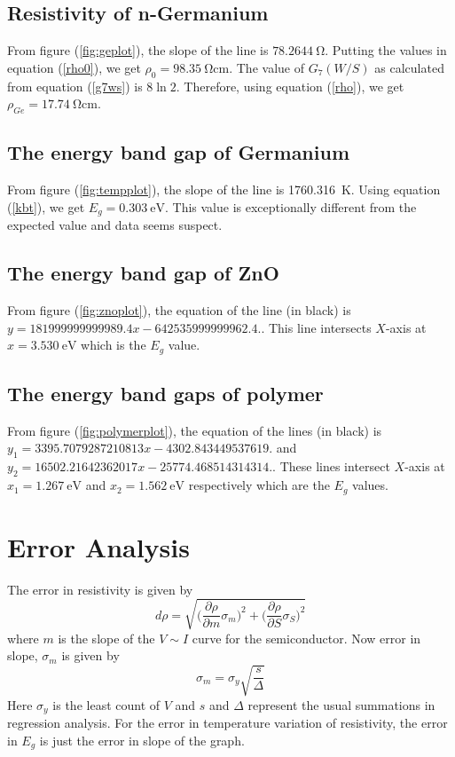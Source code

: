\documentclass[%
 aip,
 amsmath,amssymb,
 reprint,%
]{revtex4-1}
\begin{document}
\subsection{Resistivity of n-Germanium}
From figure (\ref{fig:geplot}), the slope of the line is $\SI{78.2644}{\ohm}$. Putting the values in equation (\ref{rho0}), we get $\rho_0 = \SI{98.35}{\ohm \centi \metre}$. The value of $G_7 (W/S)$ as calculated from equation (\ref{g7ws}) is $8 \ln 2$. Therefore, using equation (\ref{rho}), we get $\rho_{Ge} = \SI{17.74}{\ohm \centi \metre}$.
\subsection{The energy band gap of Germanium}
From figure (\ref{fig:tempplot}), the slope of the line is \SI{1760.316}{\kelvin}. Using equation (\ref{kbt}), we get $E_g = \SI{0.303}{\electronvolt}$. This value is exceptionally different from the expected value and data seems suspect.
\subsection{The energy band gap of ZnO}
From figure (\ref{fig:znoplot}), the equation of the line (in black) is $y = 181999999999989.4x -642535999999962.4.$. This line intersects $X$-axis at $x = \SI{3.530}{\electronvolt}$ which is the $E_g$ value.
\subsection{The energy band gaps of polymer}
From figure (\ref{fig:polymerplot}), the equation of the lines (in black) is $y_1 = 3395.7079287210813x -4302.843449537619.$ and $y_2 = 16502.21642362017x -25774.468514314314.$. These lines intersect $X$-axis at $x_1 = \SI{1.267}{\electronvolt}$ and $x_2 = \SI{1.562}{\electronvolt}$ respectively which are the $E_g$ values.
\section{Error Analysis}
The error in resistivity is given by
\begin{equation}
    d \rho = \sqrt{\Big(\dfrac{\partial \rho}{\partial m} \sigma_{m}\Big)^2 + \Big(\dfrac{\partial \rho}{\partial S} \sigma_{S}\Big)^2}
\end{equation}
where $m$ is the slope of the $V \sim I$ curve for the semiconductor.
Now error in slope, $\sigma_m$ is given by
\begin{equation}
    \sigma_m = \sigma_y \sqrt{\dfrac{s}{\Delta}}
\end{equation}
Here $\sigma_y$ is the least count of $V$ and $s$ and $\Delta$ represent the usual summations in regression analysis.
For the error in temperature variation of resistivity, the error in $E_g$ is just the error in slope of the graph.
\end{document}
